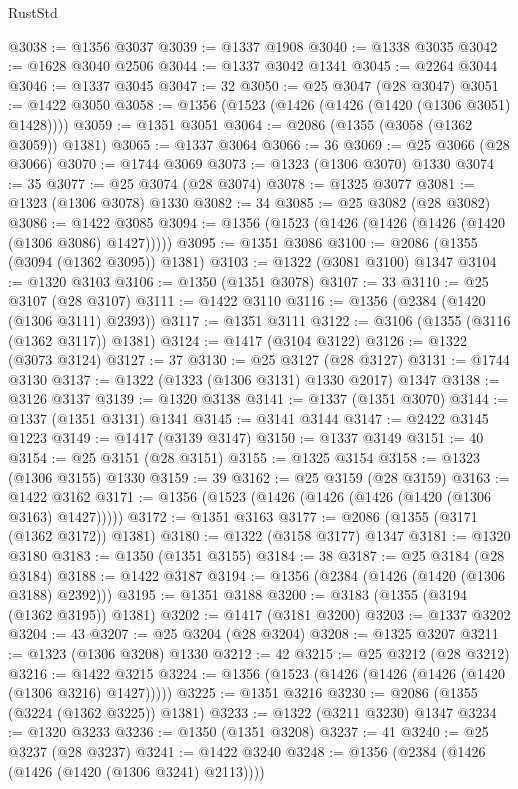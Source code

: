 \begin{lexlean}{RustStd}
\begin{coremodule}
@3038 := @1356 @3037
@3039 := @1337 @1908
@3040 := @1338 @3035
@3042 := @1628 @3040 @2506
@3044 := @1337 @3042 @1341
@3045 := @2264 @3044
@3046 := @1337 @3045
@3047 := 32
@3050 := @25 @3047 (@28 @3047)
@3051 := @1422 @3050
@3058 := @1356 (@1523 (@1426 (@1426 (@1420 (@1306 @3051) @1428))))
@3059 := @1351 @3051
@3064 := @2086 (@1355 (@3058 (@1362 @3059)) @1381)
@3065 := @1337 @3064
@3066 := 36
@3069 := @25 @3066 (@28 @3066)
@3070 := @1744 @3069
@3073 := @1323 (@1306 @3070) @1330
@3074 := 35
@3077 := @25 @3074 (@28 @3074)
@3078 := @1325 @3077
@3081 := @1323 (@1306 @3078) @1330
@3082 := 34
@3085 := @25 @3082 (@28 @3082)
@3086 := @1422 @3085
@3094 := @1356 (@1523 (@1426 (@1426 (@1426 (@1420 (@1306 @3086) @1427)))))
@3095 := @1351 @3086
@3100 := @2086 (@1355 (@3094 (@1362 @3095)) @1381)
@3103 := @1322 (@3081 @3100) @1347
@3104 := @1320 @3103
@3106 := @1350 (@1351 @3078)
@3107 := 33
@3110 := @25 @3107 (@28 @3107)
@3111 := @1422 @3110
@3116 := @1356 (@2384 (@1420 (@1306 @3111) @2393))
@3117 := @1351 @3111
@3122 := @3106 (@1355 (@3116 (@1362 @3117)) @1381)
@3124 := @1417 (@3104 @3122)
@3126 := @1322 (@3073 @3124)
@3127 := 37
@3130 := @25 @3127 (@28 @3127)
@3131 := @1744 @3130
@3137 := @1322 (@1323 (@1306 @3131) @1330 @2017) @1347
@3138 := @3126 @3137
@3139 := @1320 @3138
@3141 := @1337 (@1351 @3070)
@3144 := @1337 (@1351 @3131) @1341
@3145 := @3141 @3144
@3147 := @2422 @3145 @1223
@3149 := @1417 (@3139 @3147)
@3150 := @1337 @3149
@3151 := 40
@3154 := @25 @3151 (@28 @3151)
@3155 := @1325 @3154
@3158 := @1323 (@1306 @3155) @1330
@3159 := 39
@3162 := @25 @3159 (@28 @3159)
@3163 := @1422 @3162
@3171 := @1356 (@1523 (@1426 (@1426 (@1426 (@1420 (@1306 @3163) @1427)))))
@3172 := @1351 @3163
@3177 := @2086 (@1355 (@3171 (@1362 @3172)) @1381)
@3180 := @1322 (@3158 @3177) @1347
@3181 := @1320 @3180
@3183 := @1350 (@1351 @3155)
@3184 := 38
@3187 := @25 @3184 (@28 @3184)
@3188 := @1422 @3187
@3194 := @1356 (@2384 (@1426 (@1420 (@1306 @3188) @2392)))
@3195 := @1351 @3188
@3200 := @3183 (@1355 (@3194 (@1362 @3195)) @1381)
@3202 := @1417 (@3181 @3200)
@3203 := @1337 @3202
@3204 := 43
@3207 := @25 @3204 (@28 @3204)
@3208 := @1325 @3207
@3211 := @1323 (@1306 @3208) @1330
@3212 := 42
@3215 := @25 @3212 (@28 @3212)
@3216 := @1422 @3215
@3224 := @1356 (@1523 (@1426 (@1426 (@1426 (@1420 (@1306 @3216) @1427)))))
@3225 := @1351 @3216
@3230 := @2086 (@1355 (@3224 (@1362 @3225)) @1381)
@3233 := @1322 (@3211 @3230) @1347
@3234 := @1320 @3233
@3236 := @1350 (@1351 @3208)
@3237 := 41
@3240 := @25 @3237 (@28 @3237)
@3241 := @1422 @3240
@3248 := @1356 (@2384 (@1426 (@1426 (@1420 (@1306 @3241) @2113))))

\end{coremodule}
\end{lexlean}
